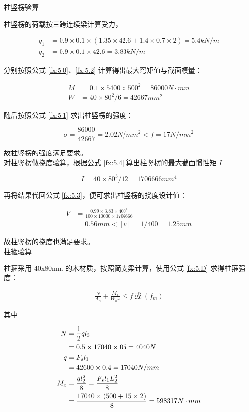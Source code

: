  柱竖楞验算

柱竖楞的荷载按三跨连续梁计算受力，

\begin{align*}
    q_1&=0.9\times 0.1\times(1.35\times 42.6+1.4\times 0.7\times 2)=5.4 kN/m\\
    q_2&=0.9\times 0.1\times 42.6=3.83 kN/m
\end{align*}

分别按照公式 \ref{fx:5.0}、\ref{fx:5.2} 计算得出最大弯矩值与截面模量：

\begin{align*}
    M&=0.1\times 5400\times 500^2=86000 N \cdot mm\\
    W&=40\times 80^2 /6=42667 mm^2
\end{align*}

随后按照公式 \ref{fx:5.1} 求出柱竖楞的强度：

\[
    \sigma = \frac{86000}{42667}=2.02 N/mm^2< f=17N/mm^2
\]

故柱竖楞的强度满足要求。\\

对柱竖楞做挠度验算，根据公式 \ref{fx:5.4} 算出柱竖楞的最大截面惯性矩 $I$

\[
    I=40\times 80^3 /12=1706666 mm^4
\]

再将结果代回公式 \ref{fx:5.3}，便可求出柱竖楞的挠度设计值：

\begin{align*}
    V&=\frac{0.99\times 3.83 \times 400^4}{100\times 10000\times 1706666}\\
    &=0.56 mm<[v]=1/400=1.25mm
\end{align*}

故柱竖楞的挠度也满足要求。\\

 柱箍验算

柱箍采用 40x80mm 的木材质，按照简支梁计算，使用公式 \ref{fx:5.D} 求得柱箍强度：

\begin{align}
    \label{fx:5.D}
    \frac{N}{A_n}+\frac{M_x}{W_nx}\leq f \ \text{或} \ (f_m)
\end{align}

其中

\begin{align}
\label{fx:5.E}
N&=\frac{1}{2}ql_3\\
&=0.5\times 17040\times 05=4040 N \notag\\
\label{fx:5.F}
q&=F_sl_1\\
&=42600\times 0.4=17040 N/mm \notag\\
\label{fx:5.G}
M_x&=\frac{ql_2^2}{8}=\frac{F_sl_1L_2^2}{8}\\
&=\frac{17040\times (500+15\times 2)}{8}=598317 N \cdot mm \notag
\end{align}

